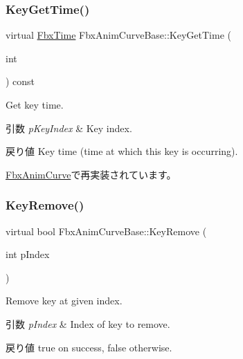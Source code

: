 \subsubsection{\texorpdfstring{Key\+Get\+Time()}{KeyGetTime()}}
{\footnotesize\ttfamily virtual \hyperlink{class_fbx_time}{Fbx\+Time} Fbx\+Anim\+Curve\+Base\+::\+Key\+Get\+Time (\begin{DoxyParamCaption}\item[{int}]{ }\end{DoxyParamCaption}) const\hspace{0.3cm}{\ttfamily [virtual]}}

Get key time. 
\begin{DoxyParams}{引数}
{\em p\+Key\+Index} & Key index. \\
\hline
\end{DoxyParams}
\begin{DoxyReturn}{戻り値}
Key time (time at which this key is occurring). 
\end{DoxyReturn}


\hyperlink{class_fbx_anim_curve_a547f7842ea7bae5b5ed048d15b8b0d07}{Fbx\+Anim\+Curve}で再実装されています。

\mbox{\label{class_fbx_anim_curve_base_a4d7d1bbd3d40020469aafd7c023f80d5}} 
\subsubsection{\texorpdfstring{Key\+Remove()}{KeyRemove()}\hspace{0.1cm}{\footnotesize\ttfamily [1/2]}}
{\footnotesize\ttfamily virtual bool Fbx\+Anim\+Curve\+Base\+::\+Key\+Remove (\begin{DoxyParamCaption}\item[{int}]{p\+Index }\end{DoxyParamCaption})\hspace{0.3cm}{\ttfamily [pure virtual]}}

Remove key at given index. 
\begin{DoxyParams}{引数}
{\em p\+Index} & Index of key to remove. \\
\hline
\end{DoxyParams}
\begin{DoxyReturn}{戻り値}
{\ttfamily true} on success, {\ttfamily false} otherwise. 
\end{DoxyReturn}


